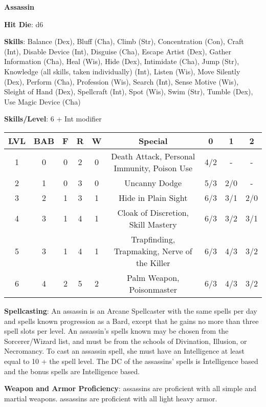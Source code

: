 \textbf{\huge{Assassin}}

\textbf{Hit Die}: d6

\textbf{Skills}: Balance (Dex), Bluff (Cha), Climb (Str), Concentration (Con), Craft (Int), Disable Device (Int), Disguise (Cha), Escape Artist (Dex), Gather Information (Cha), Heal (Wis), Hide (Dex), Intimidate (Cha), Jump (Str), Knowledge (all skills, taken individually) (Int), Listen (Wis), Move Silently (Dex), Perform (Cha), Profession (Wis), Search (Int), Sense Motive (Wis), Sleight of Hand (Dex), Spellcraft (Int), Spot (Wis), Swim (Str), Tumble (Dex), Use Magic Device (Cha)

\textbf{Skills/Level}: 6 + Int modifier

\begin{center}
\begin{adjustwidth}{-4cm}{}
\begin{small}
\begin{tabular}{| c | c | c | c | c | c | c | c | c |}
\hline
LVL &BAB &F &R &W &Special &0 &1 &2 \\
\hline
1 &0 &0 &2 &0 &Death Attack, Personal Immunity, Poison Use &4/2 &- &- \\
2 &1 &0 &3 &0 &Uncanny Dodge &5/3 &2/0 &- \\
3 &2 &1 &3 &1 &Hide in Plain Sight &6/3 &3/1 &2/0 \\
4 &3 &1 &4 &1 &Cloak of Discretion, Skill Mastery &6/3 &3/2 &3/1 \\
5 &3 &1 &4 &1 &Trapfinding, Trapmaking, Nerve of the Killer &6/3 &4/3 &3/2 \\
6 &4 &2 &5 &2 &Palm Weapon, Poisonmaster &6/3 &4/3 &3/2 \\
\hline
\end{tabular}
\end{small}
\end{adjustwidth}
\end{center}

\textbf{Spellcasting}: An assassin is an Arcane Spellcaster with the same spells per day and spells known progression as a Bard, except that he gains no more than three spell slots per level. An assassin’s spells known may be chosen from the Sorcerer/Wizard list, and must be from the schools of Divination, Illusion, or Necromancy. To cast an assassin spell, she must have an Intelligence at least equal to 10 + the spell level. The DC of the assassins’ spells is Intelligence based and the bonus spells are Intelligence based.

\textbf{Weapon and Armor Proficiency}: assassins are proficient with all simple and martial weapons. assassins are proficient with all light heavy armor.

